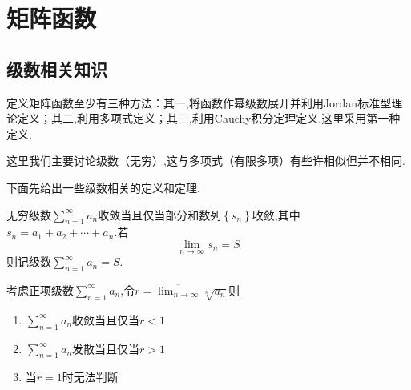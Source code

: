 \section{矩阵函数}
\subsection{级数相关知识}
\begin{red}
    \begin{remark}
        定义矩阵函数至少有三种方法：其一,将函数作幂级数展开并利用\textup{Jordan}标准型理论定义；其二,利用多项式定义；其三,利用\textup{Cauchy}积分定理定义.这里采用第一种定义.
    \end{remark}
\end{red}
\begin{red}
    \begin{remark}
        这里我们主要讨论级数（无穷）,这与多项式（有限多项）有些许相似但并不相同.
    \end{remark}
\end{red}
\begin{red}
    \begin{remark}
        下面先给出一些级数相关的定义和定理.
    \end{remark}
\end{red}
\begin{formal}
    \begin{definition}[级数收敛的定义]\label{def:级数收敛的定义}
        无穷级数$\displaystyle \sum_{n=1}^{\infty}a_n$收敛当且仅当部分和数列$\left\{s_n\right\}$收敛,其中$s_n=a_1+a_2+\cdots+a_n.$若\[
        \lim_{n\to \infty}s_n=S
        \]则记级数$\displaystyle \sum_{n=1}^{\infty}a_n=S$.
    \end{definition}
\end{formal}
\begin{formal}
    \begin{theorem}[Cauchy审敛法]\label{thm:Cauchy审敛法}
        考虑正项级数$\displaystyle \sum_{n=1}^{\infty}a_n$,令$\displaystyle r=\overline{\lim_{n\to\infty}}\sqrt[n]{a_n}$则\begin{enumerate}[label={\textup{(\arabic*)}}]
            \item $\displaystyle \sum_{n=1}^{\infty}a_n$收敛当且仅当$r<1$
            \item $\displaystyle \sum_{n=1}^{\infty}a_n$发散当且仅当$r>1$
            \item 当$r=1$时无法判断
        \end{enumerate}
    \end{theorem}
\end{formal}
